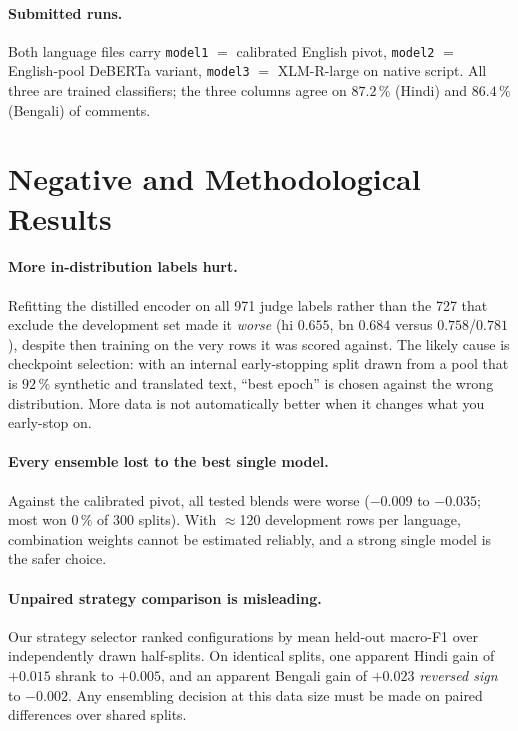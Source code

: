 \documentclass[twocolumn]{ceurart}
\begin{document}
\paragraph{Submitted runs.}
Both language files carry
\texttt{model1} $=$ calibrated English pivot,
\texttt{model2} $=$ English-pool DeBERTa variant,
\texttt{model3} $=$ XLM-R-large on native script. All three are trained
classifiers; the three columns agree on $87.2\,\%$ (Hindi) and $86.4\,\%$
(Bengali) of comments.

\section{Negative and Methodological Results}
\label{sec:negative}

\paragraph{More in-distribution labels hurt.}
Refitting the distilled encoder on all 971 judge labels rather than the 727 that
exclude the development set made it \emph{worse} (hi $0.655$, bn $0.684$ versus
$0.758$/$0.781$), despite then training on the very rows it was scored against.
The likely cause is checkpoint selection: with an internal early-stopping split
drawn from a pool that is $92\,\%$ synthetic and translated text, ``best epoch''
is chosen against the wrong distribution. More data is not automatically better
when it changes what you early-stop on.

\paragraph{Every ensemble lost to the best single model.}
Against the calibrated pivot, all tested blends were worse
($-0.009$ to $-0.035$; most won $0\,\%$ of 300 splits). With $\approx$120
development rows per language, combination weights cannot be estimated
reliably, and a strong single model is the safer choice.

\paragraph{Unpaired strategy comparison is misleading.}
Our strategy selector ranked configurations by mean held-out macro-F1 over
independently drawn half-splits. On identical splits, one apparent Hindi gain of
$+0.015$ shrank to $+0.005$, and an apparent Bengali gain of $+0.023$
\emph{reversed sign} to $-0.002$. Any ensembling decision at this data size must
be made on paired differences over shared splits.
\end{document}
